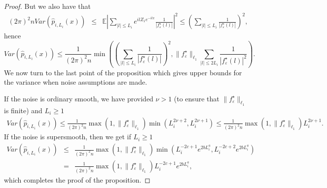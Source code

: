 \documentclass[11pt,a4paper,openany]{article}
\def\E{\mathbb{E}}
\begin{document}
\begin{proof}
But we also have that 
\begin{eqnarray*}
(2\pi)^2n Var(\widehat p_{i, L_i}(x)) &\leq& \E \left | \sum_{ | l | \leq L_i} e^{il Z_1 e^{-il x}}  \frac{1}{ |f^\star_{\varepsilon}(l)| }\right |^2 
\leq   \left  ( \sum_{ | l | \leq L_i}  \frac{1}{ |f^\star_{\varepsilon}(l)| }\right )^2,
\end{eqnarray*}
hence 
$$
Var(\widehat p_{i, L_i}(x))  \leq  \frac{1}{(2\pi)^2n} \min \left ( \left  ( \sum_{ | l | \leq L_i}  \frac{1}{ |f^\star_{\varepsilon}(l)| }\right )^2,   \| f^\star_{\varepsilon} \|_{\ell_1}  \sum_{|l | \leq 2L_i }   \frac{1}{ |f^\star_{\varepsilon}(l)|^2}     \right).
$$
We now turn to the last point of the proposition which gives upper bounds for the variance when noise assumptions are made.
\medskip

 If the noise is ordinary smooth, we have provided   $\nu >1$ (to ensure that $\| f^{\star}_{\varepsilon} \|_{\ell_1}$ is finite) and $L_i\geq 1$ 
\begin{eqnarray*}
Var(\widehat p_{i, L_i}(x)) \leq \frac{1}{(2\pi)^2n} \max(1,  \|f^\star_\varepsilon\|_{\ell_1} ) \min(L_i^{2\nu+2}, L_i^{2\nu+1}) \leq  \frac{1}{(2\pi)^2n}  \max(1,  \|f^\star_\varepsilon\|_{\ell_1} )  L_i^{2\nu+1}.
\end{eqnarray*}
If the noise is supersmooth, then we get if $L_i\geq 1$
\begin{eqnarray*}
Var(\widehat p_{i, L_i}(x)) &\leq & \frac{1}{(2\pi)^2n}  \max(1,  \|f^\star_\varepsilon\|_{\ell_1} ) \min (L_i^{-2 c +1 } e^{2 b L_i^a}, L_i^{-2 c +2 } e^{2 b L_i^a}) \\
&=&   \frac{1}{(2\pi)^2n}  \max(1,  \|f^\star_\varepsilon\|_{\ell_1} ) L_i^{-2 c +1 } e^{2 b L_i^a},
\end{eqnarray*}
which completes the proof of the proposition.
\end{proof}
\end{document}
